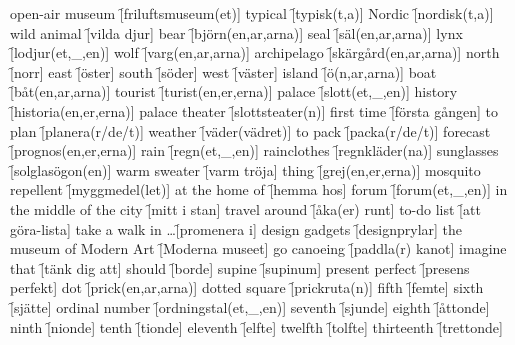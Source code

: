 \begin{questions}
    \begin{multicols}{2}
        \raggedcolumns
        \question open-air museum \f[friluftsmuseum(et)]
        \question typical \f[typisk(t,a)]
        \question Nordic \f[nordisk(t,a)]
        \question wild animal \f[vilda djur]
        \question bear \f[björn(en,ar,arna)]
        \question seal \f[säl(en,ar,arna)]
        \question lynx \f[lodjur(et,\_,en)]
        \question wolf \f[varg(en,ar,arna)]
        \question archipelago \f[skärgård(en,ar,arna)]
        \question north \f[norr]
        \question east \f[öster]
        \question south \f[söder]
        \question west \f[väster]
        \question island \f[ö(n,ar,arna)]
        \question boat \f[båt(en,ar,arna)]
        \question tourist \f[turist(en,er,erna)]
        \question palace \f[slott(et,\_,en)]
        \question history \f[historia(en,er,erna)]
        \question palace theater \f[slottsteater(n)]
        \question first time \f[första gången]
        \question to plan \f[planera(r/de/t)]
        \question weather \f[väder(vädret)]
        \question to pack \f[packa(r/de/t)]
        \question forecast \f[prognos(en,er,erna)]
        \question rain \f[regn(et,\_,en)]
        \question rainclothes \f[regnkläder(na)]
        \question sunglasses \f[solglasögon(en)]
        \question warm sweater \f[varm tröja]
        \question thing \f[grej(en,er,erna)]
        \question mosquito repellent \f[myggmedel(let)]
        \question at the home of \f[hemma hos]
        \question forum \f[forum(et,\_,en)]
        \question in the middle of the city \f[mitt i stan]
        \question travel around \f[åka(er) runt]
        \question to-do list \f[att göra-lista]
        \question take a walk in \ldots \f[promenera i]
        \question design gadgets \f[designprylar]
        \question the museum of Modern Art \f[Moderna museet]
        \question go canoeing \f[paddla(r) kanot]
        \question imagine that \f[tänk dig att]
        \question should \f[borde]
        \question supine \f[supinum]
        \question present perfect \f[presens perfekt]
        \question dot \f[prick(en,ar,arna)]
        \question dotted square \f[prickruta(n)]
        \question fifth \f[femte]
        \question sixth \f[sjätte]
        \question ordinal number \f[ordningstal(et,\_,en)]
        \question seventh \f[sjunde]
        \question eighth \f[åttonde]
        \question ninth \f[nionde]
        \question tenth \f[tionde]
        \question eleventh \f[elfte]
        \question twelfth \f[tolfte]
        \question thirteenth \f[trettonde]

\end{multicols}
\end{questions}
